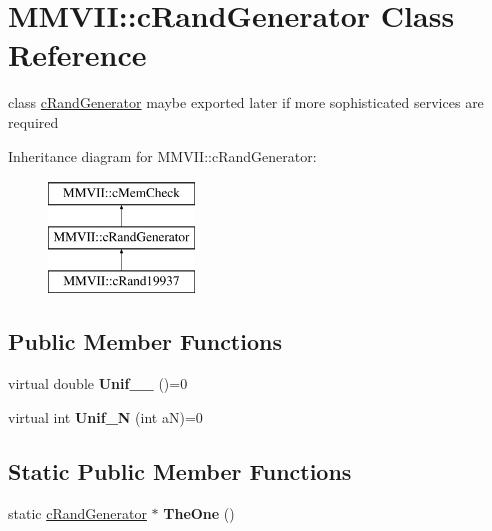 \hypertarget{classMMVII_1_1cRandGenerator}{}\section{M\+M\+V\+II\+:\+:c\+Rand\+Generator Class Reference}
\label{classMMVII_1_1cRandGenerator}


class \hyperlink{classMMVII_1_1cRandGenerator}{c\+Rand\+Generator} maybe exported later if more sophisticated services are required  


Inheritance diagram for M\+M\+V\+II\+:\+:c\+Rand\+Generator\+:\begin{figure}[H]
\begin{center}
\leavevmode
\includegraphics[height=3.000000cm]{classMMVII_1_1cRandGenerator}
\end{center}
\end{figure}
\subsection*{Public Member Functions}
\begin{DoxyCompactItemize}
\item 
virtual double {\bfseries Unif\+\_\+\_} ()=0\hypertarget{classMMVII_1_1cRandGenerator_a35c6fdadc8b630d2eb4a86ab45b8c015}{}\label{classMMVII_1_1cRandGenerator_a35c6fdadc8b630d2eb4a86ab45b8c015}

\item 
virtual int {\bfseries Unif\+\_\+N} (int aN)=0\hypertarget{classMMVII_1_1cRandGenerator_a882bde2b94345785d05522767b5a7f13}{}\label{classMMVII_1_1cRandGenerator_a882bde2b94345785d05522767b5a7f13}

\end{DoxyCompactItemize}
\subsection*{Static Public Member Functions}
\begin{DoxyCompactItemize}
\item 
static \hyperlink{classMMVII_1_1cRandGenerator}{c\+Rand\+Generator} $\ast$ {\bfseries The\+One} ()\hypertarget{classMMVII_1_1cRandGenerator_a246c298ba7b593556725838b05d5d948}{}\label{classMMVII_1_1cRandGenerator_a246c298ba7b593556725838b05d5d948}

\end{DoxyCompactItemize}
